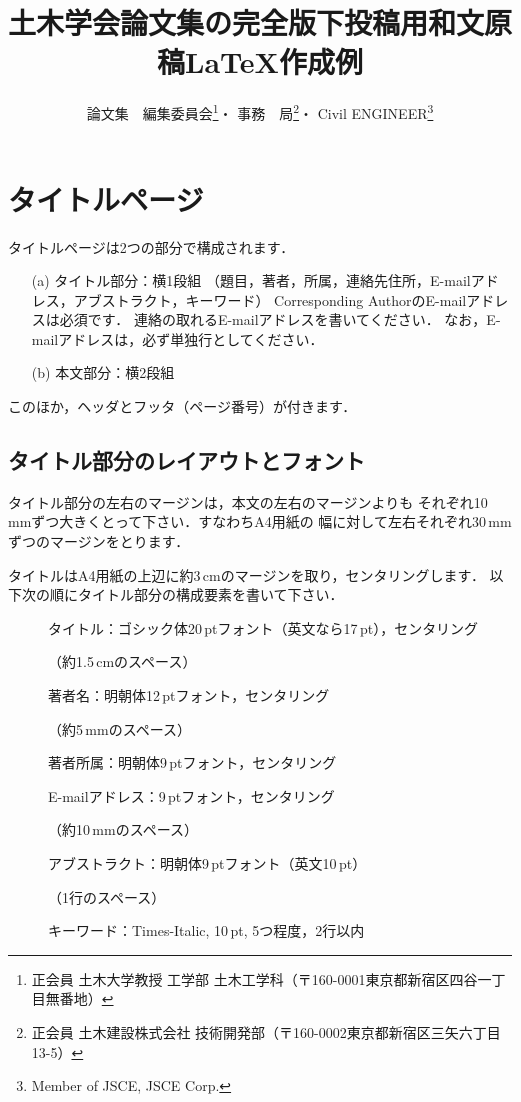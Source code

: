 \documentclass[dvipdfmx]{jsce}
\title{土木学会論文集の完全版下投稿用和文原稿\LaTeX 作成例}
\author{論文集　編集委員会\thanks{正会員 土木大学教授 工学部 土木工学科（〒160-0001東京都新宿区四谷一丁目無番地）\email{your_name@foo.ac.jp}}・
        事務　局\thanks{正会員 土木建設株式会社 技術開発部（〒160-0002東京都新宿区三矢六丁目13-5）\email{author2@foo.ac.jp} \correspo}・
        Civil ENGINEER\thanks{Member of JSCE, JSCE Corp. \email{author3@foo.ac.jp}}
        }
\begin{document}
\maketitle

\section{タイトルページ}

タイトルページは2つの部分で構成されます．
\begin{enumerate}
\setlength{\leftskip}{1em}
\setlength{\itemsep}{1ex}
\item[(a)] タイトル部分：横1段組
         （題目，著者，所属，連絡先住所，E-mailアドレス，アブストラクト，キーワード）
          Corresponding AuthorのE-mailアドレスは必須です．
          連絡の取れるE-mailアドレスを書いてください．
          なお，E-mailアドレスは，必ず単独行としてください．\par
\item[(b)] 本文部分：横2段組
\end{enumerate}
\par
このほか，ヘッダとフッタ（ページ番号）が付きます．

\subsection{タイトル部分のレイアウトとフォント}
タイトル部分の左右のマージンは，本文の左右のマージンよりも
それぞれ10\,mmずつ大きくとって下さい．すなわちA4用紙の
幅に対して左右それぞれ30\,mmずつのマージンをとります．

タイトルはA4用紙の上辺に約3\,cmのマージンを取り，センタリングします．
以下次の順にタイトル部分の構成要素を書いて下さい．
\begin{description}
\item[] タイトル：ゴシック体20\,ptフォント（英文なら17\,pt），センタリング\par
        （約1.5\,cmのスペース）
\item[] 著者名：明朝体12\,ptフォント，センタリング\par
        （約5\,mmのスペース）
\item[] 著者所属：明朝体9\,ptフォント，センタリング\par
\item[] E-mailアドレス：9\,ptフォント，センタリング\par
        （約10\,mmのスペース）
\item[] アブストラクト：明朝体9\,ptフォント（英文10\,pt）\par
        （1行のスペース）
\item[] キーワード：Times-Italic, 10\,pt, 5つ程度，2行以内
\end{description}
\end{document}
